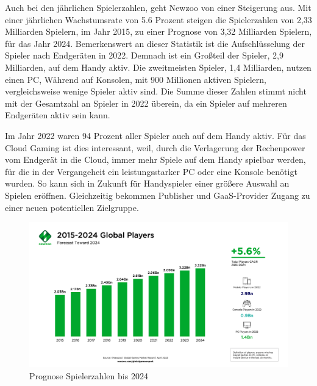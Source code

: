 \documentclass[12pt,toc=bib,toc=listof]{scrreprt}
\begin{document}
Auch bei den jährlichen Spielerzahlen, geht Newzoo von einer Steigerung aus. Mit einer jährlichen 
Wachstumsrate von 5.6 Prozent steigen die Spielerzahlen von 2,33 Milliarden Spielern, im Jahr 2015,
zu einer Prognose von 3,32 Milliarden Spielern, für das Jahr 2024. Bemerkenswert an dieser Statistik
ist die Aufschlüsselung der Spieler nach Endgeräten in 2022. Demnach ist ein Großteil der Spieler, 
2,9 Milliarden, auf dem Handy aktiv. Die zweitmeisten Spieler, 1,4 Milliarden, nutzen einen PC, Während
auf Konsolen, mit 900 Millionen aktiven Spielern, vergleichsweise wenige Spieler aktiv sind. 
Die Summe dieser Zahlen stimmt nicht mit der Gesamtzahl an Spieler in 2022 überein, da ein Spieler 
auf mehreren Endgeräten aktiv sein kann. 

Im Jahr 2022 waren 94 Prozent aller Spieler auch auf dem Handy aktiv. Für das Cloud Gaming ist dies interessant,
weil, durch die Verlagerung der Rechenpower vom Endgerät in die Cloud, immer mehr Spiele auf dem Handy spielbar werden, für
die in der Vergangeheit ein leistungsstarker PC oder eine Konsole benötigt wurden. So kann sich in Zukunft für Handyspieler 
einer größere Auswahl an Spielen eröffnen. Gleichzeitig bekommen Publisher und GaaS-Provider Zugang zu einer neuen potentiellen
Zielgruppe.
\\%
\begin{figure}[h]
 \centering
  \includegraphics[scale=0.12]{Abbildungen/Newzoo_Global_Players_Forecast.png} 
  \caption[Newzoo]{Prognose Spielerzahlen bis 2024}
\end{figure}
\\%
\end{document}
